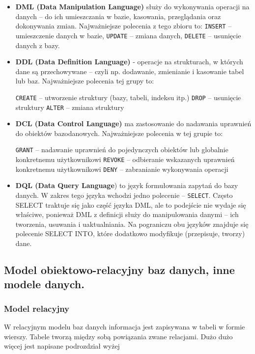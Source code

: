 \documentclass[a4paper,12pt,oneside]{book}
\begin{document}
			\begin{itemize}
			\item \textbf{DML (Data Manipulation Language)} służy do wykonywania operacji na danych – do ich umieszczania w bazie, kasowania, przeglądania oraz dokonywania zmian. Najważniejsze polecenia z tego zbioru to:
			\subitem \verb*|INSERT| – umieszczenie danych w bazie,
			\subitem \verb*|UPDATE| – zmiana danych,
			\subitem \verb*|DELETE| – usunięcie danych z bazy.
			
			\item \textbf{DDL (Data Definition Language)} - operacje na strukturach, w których dane są przechowywane – czyli np. dodawanie, zmienianie i kasowanie tabel lub baz. Najważniejsze polecenia tej grupy to:
			
			\subitem \verb*|CREATE| – utworzenie struktury (bazy, tabeli, indeksu itp.)
			\subitem \verb*|DROP| – usunięcie struktury
			\subitem \verb*|ALTER| – zmiana struktury

			\item \textbf{DCL (Data Control Language)} ma zastosowanie do nadawania uprawnień do obiektów bazodanowych. Najważniejsze polecenia w tej grupie to:
			
			\subitem \verb*|GRANT| – nadawanie uprawnień do pojedynczych obiektów lub globalnie konkretnemu użytkownikowi
			\subitem \verb*|REVOKE| – odbieranie wskazanych uprawnień konkretnemu użytkownikowi
			\subitem \verb*|DENY| – zabranianie wykonywania operacji

			\item \textbf{DQL (Data Query Language}) to język formułowania zapytań do bazy danych. W zakres tego języka wchodzi jedno polecenie – \verb*|SELECT|. Często SELECT traktuje się jako część języka DML, ale to podejście nie wydaje się właściwe, ponieważ DML z definicji służy do manipulowania danymi – ich tworzenia, usuwania i uaktualniania. Na pograniczu obu języków znajduje się polecenie SELECT INTO, które dodatkowo modyfikuje (przepisuje, tworzy) dane.
			\end{itemize}
				
				
			\newpage\subsection{Model obiektowo-relacyjny baz danych, inne modele danych.}
			\subsubsection{Model relacyjny}
			W relacyjnym modelu baz danych informacja jest zapisywana w tabeli w formie wierszy. Tabele tworzą między sobą powiązania zwane relacjami. Dużo dużo więcej jest napisane podrozdział wyżej
			
\end{document}
